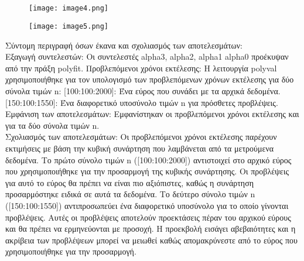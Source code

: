 \documentclass[12pt,a4paper]{article}
\begin{document}
\subsection{}
\begin{figure}[h]
\centering
\texttt{[image: image4.png]} 
\label{fig:image5}
\end{figure}
\begin{figure}[h]
\centering
\texttt{[image: image5.png]} %
\label{fig:image6}
\end{figure}
Σύντομη περιγραφή όσων έκανα και σχολιασμός των αποτελεσμάτων:\\

Εξαγωγή συντελεστών: Οι συντελεστές  alpha3, alpha2, alpha1 alpha0 προέκυψαν από την πράξη polyfit.
Προβλεπόμενοι χρόνοι εκτέλεσης: Η λειτουργία polyval χρησιμοποιήθηκε για τον υπολογισμό των προβλεπόμενων χρόνων εκτέλεσης για δύο σύνολα τιμών n:
[100:100:2000]: Ένα εύρος που συνάδει με τα αρχικά δεδομένα.
[150:100:1550]: Ένα διαφορετικό υποσύνολο τιμών n για πρόσθετες προβλέψεις.
Εμφάνιση των αποτελεσμάτων: Εμφανίστηκαν οι προβλεπόμενοι χρόνοι εκτέλεσης και για τα δύο σύνολα τιμών n.\\

Σχολιασμός των αποτελεσμάτων: Οι προβλεπόμενοι χρόνοι εκτέλεσης παρέχουν εκτιμήσεις με βάση την κυβική συνάρτηση που λαμβάνεται από τα μετρούμενα δεδομένα. Το πρώτο σύνολο τιμών n ([100:100:2000]) αντιστοιχεί στο αρχικό εύρος που χρησιμοποιήθηκε για την προσαρμογή της κυβικής συνάρτησης. Οι προβλέψεις για αυτό το εύρος θα πρέπει να είναι πιο αξιόπιστες, καθώς η συνάρτηση προσαρμόστηκε ειδικά σε αυτά τα δεδομένα. Το δεύτερο σύνολο τιμών n ([150:100:1550]) αντιπροσωπεύει ένα διαφορετικό υποσύνολο για το οποίο γίνονται προβλέψεις. Αυτές οι προβλέψεις αποτελούν προεκτάσεις πέραν του αρχικού εύρους και θα πρέπει να ερμηνεύονται με προσοχή. Η προεκβολή εισάγει αβεβαιότητες και η ακρίβεια των προβλέψεων μπορεί να μειωθεί καθώς απομακρύνεστε από το εύρος που χρησιμοποιήθηκε για την προσαρμογή.

\FloatBarrier %
\end{document}
